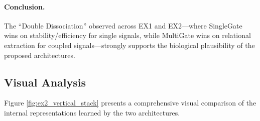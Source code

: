 \documentclass{article}
\begin{document}
\paragraph{Conclusion.}
The ``Double Dissociation'' observed across EX1 and EX2---where SingleGate wins on stability/efficiency for single signals, while MultiGate wins on relational extraction for coupled signals---strongly supports the biological plausibility of the proposed architectures.

\subsection{Visual Analysis}
Figure \ref{fig:ex2_vertical_stack} presents a comprehensive visual comparison of the internal representations learned by the two architectures.
\end{document}
